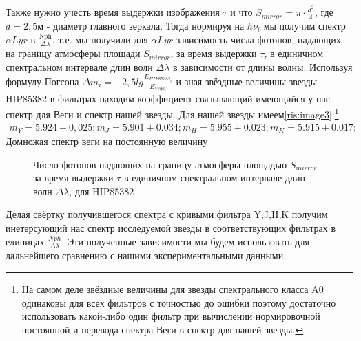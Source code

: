 \documentclass[a4paper]{article}
\begin{document}
Также нужно учесть время выдержки изображения $\tau$ и что $S_{mirror} = \pi\cdot\frac{d^2}{4}$, где $d = 2,5\text{м}$ - диаметр главного зеркала. Тогда нормируя на $h\nu_i$ мы получим спектр $\alpha Lyr$ в $\frac{\text{Nph}}{\Delta\lambda}$, т.е. мы получили для $\alpha Lyr$ зависимость числа фотонов, падающих на границу атмосферы площади $S_{mirror}$, за время выдержки $\tau$, в единичном спектральном интервале длин волн $\Delta\lambda$ в зависимости от длины волны. Используя формулу Погсона $\Delta m_i = -2,5lg{\frac{E_{HIP85382_i}}{E_{Vega_i}}}$ и зная звёздные величины звезды HIP85382 в фильтрах находим коэффициент связывающий имеющийся у нас спектр для Веги и спектр нашей звезды. Для нашей звезды имеем\ref{ris:image3}:\footnote{На самом деле звёздные величины для звезды спектрального класса A0 одинаковы для всех фильтров с точностью до ошибки поэтому достаточно использовать какой-либо один фильтр при вычислении нормировочной постоянной и перевода спектра Веги в спектр для нашей звезды.}
\begin{eqnarray*}
m_Y = 5.924\pm 0,025;
m_J = 5.901\pm 0.034;
m_H = 5.955\pm 0.023;
m_K = 5.915\pm 0.017;
\end{eqnarray*}
Домножая спектр веги на постоянную величину
\begin{figure}[h]
\caption{Число фотонов падающих на границу атмосферы площадью $S_{mirror}$ за время выдержки $\tau$ в единичном спектральном интервале длин волн $\Delta\lambda$, для HIP85382}
\label{ris:image}
\end{figure}

Делая свёртку получившегося спектра с кривыми фильтра Y,J,H,K получим инетерсующий нас спектр исследуемой звезды в соответствующих фильтрах в единицах $\frac{Nph}{\Delta\lambda}$. Эти полученные зависимости мы будем использовать для дальнейшего сравнению с нашими экспериментальными данными.
\end{document}
